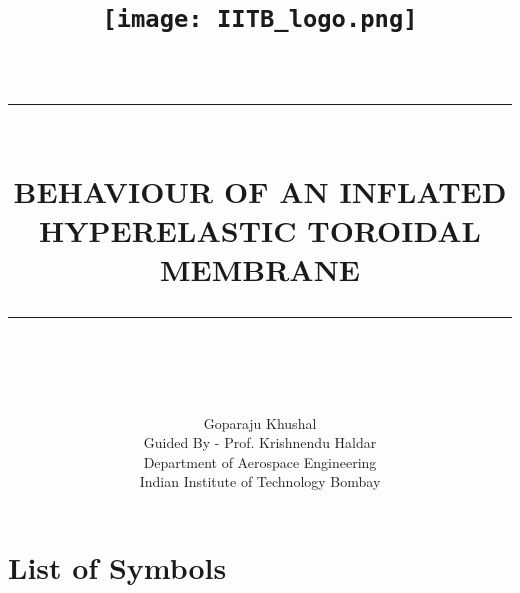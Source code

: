 \documentclass[12pt]{report}
\newcommand{\HRule}[1]{\rule{\linewidth}{#1}}
\begin{document}

\title{ \texttt{[image: IITB\_logo.png]}\\
        \large {}
		\\ [2.0cm]
		\HRule{0.5pt} \\
		\LARGE \textbf{\uppercase{Behaviour of an Inflated Hyperelastic Toroidal Membrane }}
		\HRule{2pt} \\ [0.5cm]
		\normalsize  \vspace*{5\baselineskip}}

\date{}




\author{
		Goparaju Khushal \\
        Guided By - Prof. Krishnendu Haldar  \\
Department of Aerospace Engineering\\
Indian Institute of Technology Bombay\\ }


\maketitle

\newpage
\setcounter{chapter}{1}


\chapter*{List of Symbols}
\end{document}
